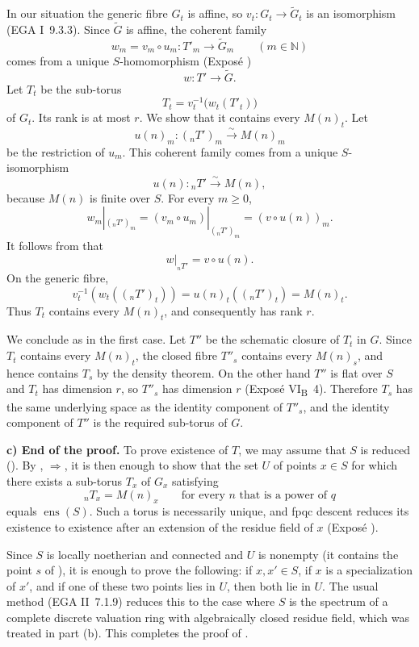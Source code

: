 In our situation the generic fibre \(G_t\) is affine, so
\(v_t:G_t\to\widetilde G_t\) is an isomorphism (EGA I~9.3.3). Since
\(\widetilde G\) is affine, the coherent family
\[
  w_m=v_m\circ u_m:T'_m\longrightarrow\widetilde G_m
  \qquad(m\in\mathbb N)
\]
comes from a unique \(S\)-homomorphism (Exposé )
\[
  w:T'\longrightarrow\widetilde G.
\]
Let \(T_t\) be the sub-torus
\[
  T_t=v_t^{-1}\bigl(w_t(T'_t)\bigr)
\]
of \(G_t\). Its rank is at most \(r\). We show that it contains every
\(M(n)_t\). Let
\[
 u(n)_m:({}_nT')_m\xrightarrow{\sim}M(n)_m
\]
be the restriction of \(u_m\). This coherent family comes from a
unique \(S\)-isomorphism
\[
  u(n):{}_nT'\xrightarrow{\sim}M(n),
\]
because \(M(n)\) is finite over \(S\). For every \(m\geq0\),
\[
 w_m|_{({}_nT')_m}
  =(v_m\circ u_m)|_{({}_nT')_m}
  =(v\circ u(n))_m.
\]
It follows from  that
\[
  w|_{{}_nT'}=v\circ u(n).
\]
On the generic fibre,
\[
 v_t^{-1}\!\left(w_t(({}_nT')_t)\right)
 =u(n)_t(({}_nT')_t)=M(n)_t.
\]
Thus \(T_t\) contains every \(M(n)_t\), and consequently has rank
\(r\).

We conclude as in the first case. Let \(T''\) be the schematic closure
of \(T_t\) in \(G\). Since \(T_t\) contains every \(M(n)_t\), the
closed fibre \(T''_s\) contains every \(M(n)_s\), and hence contains
\(T_s\) by the density theorem. On the other hand \(T''\) is flat
over \(S\) and \(T_t\) has dimension \(r\), so \(T''_s\) has
dimension \(r\) (Exposé VI\textsubscript{B}~4). Therefore \(T_s\)
has the same underlying space as the identity component of \(T''_s\),
and the identity component of \(T''\) is the required sub-torus of
\(G\).

\medskip\noindent
\textbf{c) End of the proof.}
To prove existence of \(T\), we may assume that \(S\) is reduced
(). By , \(\Rightarrow\), it is then
enough to show that the set \(U\) of points \(x\in S\) for which there
exists a sub-torus \(T_x\) of \(G_x\) satisfying
\[
  {}_nT_x=M(n)_x
  \qquad\text{for every }n\text{ that is a power of }q
\]
equals \(\operatorname{ens}(S)\). Such a torus is necessarily unique,
and fpqc descent reduces its existence to existence after an extension
of the residue field of \(x\) (Exposé ).

Since \(S\) is locally noetherian and connected and \(U\) is nonempty
(it contains the point \(s\) of ), it is enough to prove
the following: if \(x,x'\in S\), if \(x\) is a specialization of
\(x'\), and if one of these two points lies in \(U\), then both lie
in \(U\). The usual method (EGA II~7.1.9) reduces this to the case
where \(S\) is the spectrum of a complete discrete valuation ring
with algebraically closed residue field, which was treated in part
(b). This completes the proof of .

